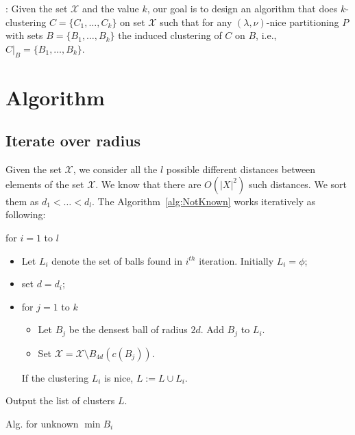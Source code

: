 \documentclass[11pt]{article}
\newenvironment{alg}{
    \begin{list}{}{
        \setlength{\itemsep}{2pt}
        \setlength{\parsep}{0pt}
        \setlength{\parskip}{0pt}
        \setlength{\topsep}{1pt}
    }
}
{
    \end{list}
}
\begin{document}
: Given the set $\mathcal{X}$ and the value $k$, our goal is to design an algorithm that does $k$-clustering $C=\{C_1,\ldots,C_k\}$ on set $\mathcal{X}$ such that  for any $(\lambda,\nu)$-nice partitioning $P$ with sets $B = \{B_1,\ldots,B_k\}$ the induced clustering of $C$ on $B$, i.e., $C|_B = \{B_1,\ldots,B_k\}$. 

\section{Algorithm}


\subsection{Iterate over radius}

Given the set $\mathcal{X}$,
we consider all the $l$ possible different distances between elements of the set $\mathcal{X}$. We know that there are $O(|X|^2)$ such distances. We sort them as $d_1<\ldots<d_l$. The Algorithm~\ref{alg:NotKnown} works iteratively as following:


\begin{algorithm}
\begin{alg}

\item[] for $i=1$ to $l$
\begin{itemize}

\item[] Let $L_i$ denote the set of balls found in $i^{th}$ iteration. Initially $L_i=\phi$;
\item[] set $d=d_i$;


\item[] for $j=1$ to $k$

\begin{itemize}

\item[] Let $B_j$ be the densest ball of radius $2d$. Add $B_j$ to $L_i$.
\item[] Set $\mathcal{X}=\mathcal{X}\setminus B_{4d}(c(B_j))$. 

\end{itemize}
If the clustering $L_i$ is nice, $L := L \cup L_i$.
\end{itemize}

Output the list of clusters $L$.
\label{alg:NotKnown}
\end{alg}
\caption{Alg. for unknown $\min{B_i}$}
\end{algorithm}
\end{document}
